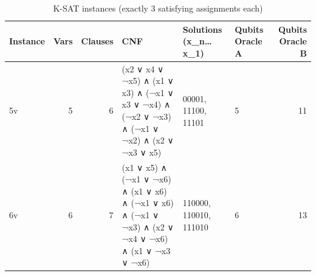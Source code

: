 \begin{table}[t]
\centering
\small
\caption{K-SAT instances (exactly 3 satisfying assignments each)}
\label{tab:instances}
\begin{tabular}{lrrlllr}
\toprule
Instance & Vars & Clauses & CNF & Solutions (x\_n…x\_1) & Qubits Oracle A & Qubits Oracle B \\
\midrule
5v & 5 & 6 & (x2 ∨ x4 ∨ ¬x5) ∧ (x1 ∨ x3) ∧ (¬x1 ∨ x3 ∨ ¬x4) ∧ (¬x2 ∨ ¬x3) ∧ (¬x1 ∨ ¬x2) ∧ (x2 ∨ ¬x3 ∨ x5) & 00001, 11100, 11101 & 5 & 11 \\
6v & 6 & 7 & (x1 ∨ x5) ∧ (¬x1 ∨ ¬x6) ∧ (x1 ∨ x6) ∧ (¬x1 ∨ x6) ∧ (¬x1 ∨ ¬x3) ∧ (x2 ∨ ¬x4 ∨ ¬x6) ∧ (x1 ∨ ¬x3 ∨ ¬x6) & 110000, 110010, 111010 & 6 & 13 \\
\bottomrule
\end{tabular}
\end{table}
